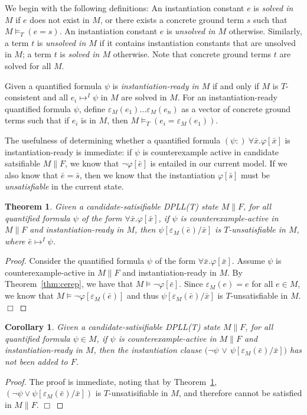 \documentclass{llncs}
\newtheorem{thm}{Theorem}
\newtheorem{cor}{Corollary}
\begin{document}
We begin with the following definitions:
An instantiation constant $e$ is \emph{solved in $M$} if $e$ does not exist in $M$, or there exists a concrete ground term $s$ such that $M \models_T (e = s)$.
An instantiation constant $e$ is \emph{unsolved in $M$} otherwise.
Similarly, a term $t$ is \emph{unsolved in $M$} if it contains instantiation constants that are unsolved in $M$; a term $t$ is \emph{solved in $M$} otherwise.
Note that concrete ground terms $t$ are solved for all $M$.

Given a quantified formula $\psi$ is \emph{instantiation-ready in $M$} if and only if $M$ is $T$-consistent and all $e_i \mapsto^I \psi$ in $M$ are solved in $M$.
For an instantiation-ready quantified formula $\psi$, define $\varepsilon_M( e_1 ) \ldots \varepsilon_M( e_n )$ as a vector of concrete ground terms such that if $e_i$ is in $M$, then $M \models_T (e_i = \varepsilon_M( e_1 ))$.

The usefulness of determining whether a quantified formula $(\psi:) \ \forall \bar{x}. \varphi[ \bar{x} ]$ is instantiation-ready is immediate:  if $\psi$ is counterexample active in candidate satsifiable $M \parallel F$, we know that $\neg \varphi[ \bar{e} ]$ is entailed in our current model.
If we also know that $\bar{e} = \bar{s}$, then we know that the instantiation $\varphi[ \bar{s} ]$ must be \emph{unsatisfiable} in the current state.

\begin{thm}
\label{thm:instready}
Given a candidate-satisifiable DPLL(T) state $M \parallel F$, for all quantified formula $\psi$ of the form $\forall \bar{x}. \varphi[ \bar{x} ]$, if $\psi$ is counterexample-active in $M \parallel F$ and instantiation-ready in $M$, then $\psi[\varepsilon_M( \bar{e} )/\bar{x}]$ is $T$-unsatisfiable in $M$, where $\bar{e} \mapsto^I \psi$.
\end{thm}
\begin{proof}
Consider the quantified formula $\psi$ of the form $\forall \bar{x}. \varphi[ \bar{x} ]$.
Assume $\psi$ is counterexample-active in $M \parallel F$ and instantiation-ready in $M$.
By Theorem~\ref{thm:cerep}, we have that $M \models \neg \varphi[\bar{e}]$.
Since $\varepsilon_{M}( e ) = e$ for all $e \in M$, we know that $M \models \neg \varphi[\varepsilon_M( \bar{e} )]$ and thus $\psi[\varepsilon_M( \bar{e} )/\bar{x}]$ is $T$-unsatisfiable in $M$. $\Box$
\end{proof}

\begin{cor}
\label{cor:instready}
Given a candidate-satisifiable DPLL(T) state $M \parallel F$, for all quantified formula $\psi \in M$,
if $\psi$ is counterexample-active in $M \parallel F$ and instantiation-ready in $M$, then the instantiation clause $( \neg \psi$ $\vee$ $\psi[\varepsilon_{M}( \bar{e} )/\bar{x}])$ has not been added to $F$.
\end{cor}
\begin{proof}
The proof is immediate, noting that by Theorem~\ref{thm:instready}, $( \neg \psi \vee \psi[\varepsilon_{M}( \bar{e} )/\bar{x}])$ is $T$-unsatisifiable in $M$, and therefore cannot be satisfied in $M \parallel F$. $\Box$
\end{proof}
\end{document}
